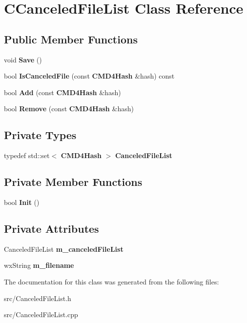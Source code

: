 \section{CCanceledFileList Class Reference}
\label{classCCanceledFileList}
\subsection*{Public Member Functions}
\begin{DoxyCompactItemize}
\item 
void {\bfseries Save} ()\label{classCCanceledFileList_aaa7b2052602e49d9174c9910c1e6aa1b}

\item 
bool {\bfseries IsCanceledFile} (const {\bf CMD4Hash} \&hash) const \label{classCCanceledFileList_aa5b3e9bdf5129ba63c20b6e27f77c908}

\item 
bool {\bfseries Add} (const {\bf CMD4Hash} \&hash)\label{classCCanceledFileList_aa18bc48dd94cb9addc4f6129047aeb03}

\item 
bool {\bfseries Remove} (const {\bf CMD4Hash} \&hash)\label{classCCanceledFileList_a4efc4b96c213c99201be04d8d7371310}

\end{DoxyCompactItemize}
\subsection*{Private Types}
\begin{DoxyCompactItemize}
\item 
typedef std::set$<$ {\bf CMD4Hash} $>$ {\bfseries CanceledFileList}\label{classCCanceledFileList_a97aec695b936211c03c2e9cf3305e52e}

\end{DoxyCompactItemize}
\subsection*{Private Member Functions}
\begin{DoxyCompactItemize}
\item 
bool {\bfseries Init} ()\label{classCCanceledFileList_a4797ac6f41e9fed7458d1e4bb190c74a}

\end{DoxyCompactItemize}
\subsection*{Private Attributes}
\begin{DoxyCompactItemize}
\item 
CanceledFileList {\bfseries m\_\-canceledFileList}\label{classCCanceledFileList_a4958f3911d7c27d981c19884b8ad71be}

\item 
wxString {\bfseries m\_\-filename}\label{classCCanceledFileList_a9f9c2aea746c6d9576d5d4b4bb5cbaca}

\end{DoxyCompactItemize}


The documentation for this class was generated from the following files:\begin{DoxyCompactItemize}
\item 
src/CanceledFileList.h\item 
src/CanceledFileList.cpp\end{DoxyCompactItemize}
